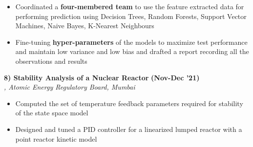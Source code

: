\documentclass[10pt,letterpaper,sans]{moderncv}        %
\newcommand\y{4}
\begin{document}
\begin{itemize}
    \item Coordinated a \textbf{four-membered team} to use the feature extracted data for performing prediction using Decision Trees, Random Forests, Support Vector Machines, Naive Bayes, K-Nearest Neighbours
    \item Fine-tuning \textbf{hyper-parameters} of the models to maximize test performance and maintain low variance and low bias and drafted a report recording all the observations and results
\end{itemize}


\vspace{\y pt}
\textbf{8) Stability Analysis of a Nuclear Reactor} \hfill{\textbf{(Nov-Dec '21)}} \\ 
{\textit{, Atomic Energy Regulatory Board, Mumbai}} 


\begin{itemize}
    \item Computed the set of temperature feedback parameters required for stability of the state space model
    \item Designed and tuned a PID controller for a linearized lumped reactor with a point reactor kinetic model
\end{itemize} 


\end{document}
